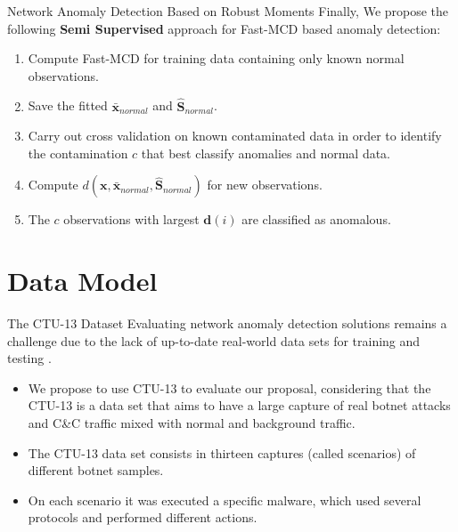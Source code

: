 \documentclass[newPxFont, numfooter, sectionpages]{beamer}
\begin{document}
\begin{frame}[c]{Network Anomaly Detection Based on Robust Moments}
    Finally, We propose the following \textbf{Semi Supervised} approach for Fast-MCD based anomaly detection:
	\begin{enumerate}
		\item Compute Fast-MCD for training data containing only known normal observations.
		\item Save the fitted $\boldsymbol{\bar{x}}_{normal}$ and $\boldsymbol{\hat{S}}_{normal}$.
		\item Carry out cross validation on known contaminated data in order to identify the contamination $c$ that best classify anomalies and normal data.
		\item Compute $d(\boldsymbol{x},\bar{\boldsymbol{x}}_{normal}, \boldsymbol{\hat{S}}_{normal})$ for new observations.
		\item The $c$ observations with largest $\boldsymbol{d}(i)$ are classified as anomalous.
	\end{enumerate}
\end{frame}


\section{Data Model}

\begin{frame}[c]{The CTU-13 Dataset}
	Evaluating network anomaly detection solutions remains a challenge due to the lack of up-to-date real-world data sets for training and testing \cite{osanaiye2016distributed}. 
	\begin{itemize}
		\item We propose to use CTU-13 \cite{garcia2014empirical} to evaluate our proposal, considering that the CTU-13 is a data set that aims to have a large capture of real botnet attacks and C\&C traffic mixed with normal and background traffic.
		\item The CTU-13 data set consists in thirteen captures (called scenarios) of different botnet samples. 
		\item On each scenario it was executed a specific malware, which used several protocols and performed different actions.		
	\end{itemize}
\end{frame}
\end{document}
